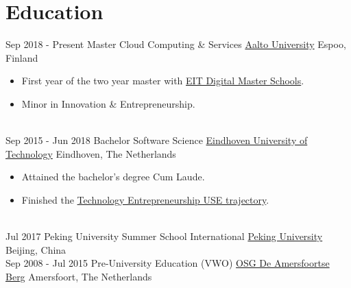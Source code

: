 \documentclass[letterpaper]{twentysecondcv} %
\begin{document}
\makeprofile %

\section{Education}

\begin{twenty} %
	\twentyitem
    	{Sep 2018 - }
        {Present}
        {Master Cloud Computing \& Services}
        {\href{https://aalto.fi/}{Aalto University}}
        {Espoo, Finland}
        {
        \begin{itemize}
            \item First year of the two year master with \href{https://masterschool.eitdigital.eu}{EIT Digital Master Schools}.
            \item Minor in Innovation \& Entrepreneurship.
        \end{itemize}
        }
    \\
    \twentyitem
    	{Sep 2015 - }
        {Jun 2018}
        {Bachelor Software Science}
        {\href{https://tue.nl/}{Eindhoven University of Technology}}
        {Eindhoven, The Netherlands}
        {
       	\begin{itemize}
   			\item Attained the bachelor's degree Cum Laude.
            \item Finished the \href{https://educationguide.tue.nl/programs/bachelor-college/use-learning-trajectory/technology-entrepreneurship/}{Technology Entrepreneurship USE trajectory}.
		\end{itemize}
    	}
    \\
	\twentyitem
    	{Jul 2017}
		{}
        {Peking University Summer School International}
        {\href{http://www.oir.pku.edu.cn/summerschool/}{Peking University}}
        {Beijing, China}
        {
    	}
    \\
    \twentyitem
	    {Sep 2008 -}
	    {Jul 2015}
	    {Pre-University Education (VWO)}
	    {\href{http://www.amersfoortseberg.nl/}{OSG De Amersfoortse Berg}}
	    {Amersfoort, The Netherlands}
	    {
	    }
\end{twenty}

\end{document}
